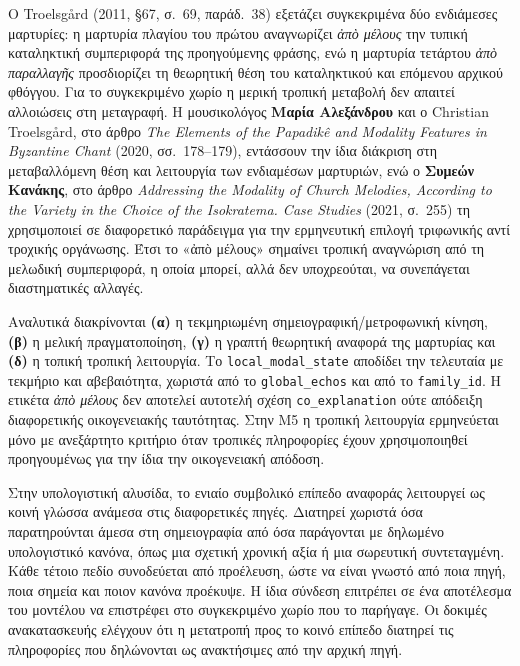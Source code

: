 \documentclass[11pt,a4paper]{article}
\begin{document}
Ο Troelsgård (2011, §67, σ.~69, παράδ.~38) εξετάζει συγκεκριμένα δύο ενδιάμεσες μαρτυρίες: η μαρτυρία πλαγίου του πρώτου αναγνωρίζει \emph{ἀπὸ μέλους} την τυπική καταληκτική συμπεριφορά της προηγούμενης φράσης, ενώ η μαρτυρία τετάρτου \emph{ἀπὸ παραλλαγῆς} προσδιορίζει τη θεωρητική θέση του καταληκτικού και επόμενου αρχικού φθόγγου. Για το συγκεκριμένο χωρίο η μερική τροπική μεταβολή δεν απαιτεί αλλοιώσεις στη μεταγραφή. Η μουσικολόγος \textbf{Μαρία Αλεξάνδρου} και ο Christian Troelsgård, στο άρθρο \emph{The Elements of the Papadikê and Modality Features in Byzantine Chant} (2020, σσ.~178--179), εντάσσουν την ίδια διάκριση στη μεταβαλλόμενη θέση και λειτουργία των ενδιαμέσων μαρτυριών, ενώ ο \textbf{Συμεών Κανάκης}, στο άρθρο \emph{Addressing the Modality of Church Melodies, According to the Variety in the Choice of the Isokratema. Case Studies} (2021, σ.~255) τη χρησιμοποιεί σε διαφορετικό παράδειγμα για την ερμηνευτική επιλογή τριφωνικής αντί τροχικής οργάνωσης. Έτσι το «ἀπὸ μέλους» σημαίνει τροπική αναγνώριση από τη μελωδική συμπεριφορά, η οποία μπορεί, αλλά δεν υποχρεούται, να συνεπάγεται διαστηματικές αλλαγές.

Αναλυτικά διακρίνονται \textbf{(α)} η τεκμηριωμένη σημειογραφική/μετροφωνική κίνηση, \textbf{(β)} η μελική πραγματοποίηση, \textbf{(γ)} η γραπτή θεωρητική αναφορά της μαρτυρίας και \textbf{(δ)} η τοπική τροπική λειτουργία. Το \texttt{local\_modal\_state} αποδίδει την τελευταία με τεκμήριο και αβεβαιότητα, χωριστά από το \texttt{global\_echos} και από το \texttt{family\_id}. Η ετικέτα \emph{ἀπὸ μέλους} δεν αποτελεί αυτοτελή σχέση \texttt{co\_explanation} ούτε απόδειξη διαφορετικής οικογενειακής ταυτότητας. Στην M5 η τροπική λειτουργία ερμηνεύεται μόνο με ανεξάρτητο κριτήριο όταν τροπικές πληροφορίες έχουν χρησιμοποιηθεί προηγουμένως για την ίδια την οικογενειακή απόδοση.

Στην υπολογιστική αλυσίδα, το ενιαίο συμβολικό επίπεδο αναφοράς λειτουργεί ως κοινή γλώσσα ανάμεσα στις διαφορετικές πηγές. Διατηρεί χωριστά όσα παρατηρούνται άμεσα στη σημειογραφία από όσα παράγονται με δηλωμένο υπολογιστικό κανόνα, όπως μια σχετική χρονική αξία ή μια σωρευτική συντεταγμένη. Κάθε τέτοιο πεδίο συνοδεύεται από προέλευση, ώστε να είναι γνωστό από ποια πηγή, ποια σημεία και ποιον κανόνα προέκυψε. Η ίδια σύνδεση επιτρέπει σε ένα αποτέλεσμα του μοντέλου να επιστρέφει στο συγκεκριμένο χωρίο που το παρήγαγε. Οι δοκιμές ανακατασκευής ελέγχουν ότι η μετατροπή προς το κοινό επίπεδο διατηρεί τις πληροφορίες που δηλώνονται ως ανακτήσιμες από την αρχική πηγή.
\end{document}
